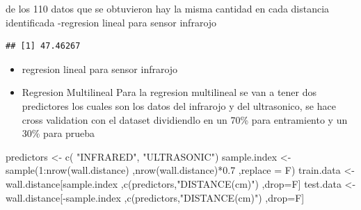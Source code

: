 \documentclass[
]{article}
\newenvironment{Shaded}{\begin{snugshade}}{\end{snugshade}}
\newcommand{\AttributeTok}[1]{\textcolor[rgb]{0.77,0.63,0.00}{#1}}
\newcommand{\DecValTok}[1]{\textcolor[rgb]{0.00,0.00,0.81}{#1}}
\newcommand{\FloatTok}[1]{\textcolor[rgb]{0.00,0.00,0.81}{#1}}
\newcommand{\FunctionTok}[1]{\textcolor[rgb]{0.00,0.00,0.00}{#1}}
\newcommand{\NormalTok}[1]{#1}
\newcommand{\OtherTok}[1]{\textcolor[rgb]{0.56,0.35,0.01}{#1}}
\newcommand{\SpecialCharTok}[1]{\textcolor[rgb]{0.00,0.00,0.00}{#1}}
\newcommand{\StringTok}[1]{\textcolor[rgb]{0.31,0.60,0.02}{#1}}
\begin{document}
de los 110 datos que se obtuvieron hay la misma cantidad en cada
distancia identificada -regresion lineal para sensor infrarojo

\begin{Shaded}
\end{Shaded}

\begin{verbatim}
## [1] 47.46267
\end{verbatim}

\begin{itemize}
\item
  regresion lineal para sensor infrarojo
\item
  Regresion Multilineal Para la regresion multilineal se van a tener dos
  predictores los cuales son los datos del infrarojo y del ultrasonico,
  se hace cross validation con el dataset dividiendlo en un 70\% para
  entramiento y un 30\% para prueba
\end{itemize}

\begin{Shaded}
\begin{Highlighting}[]
\NormalTok{predictors }\OtherTok{\textless{}{-}} \FunctionTok{c}\NormalTok{( }\StringTok{"INFRARED"}\NormalTok{, }\StringTok{"ULTRASONIC"}\NormalTok{)}
\NormalTok{sample.index }\OtherTok{\textless{}{-}} \FunctionTok{sample}\NormalTok{(}\DecValTok{1}\SpecialCharTok{:}\FunctionTok{nrow}\NormalTok{(wall.distance)}
\NormalTok{                       ,}\FunctionTok{nrow}\NormalTok{(wall.distance)}\SpecialCharTok{*}\FloatTok{0.7}
\NormalTok{                       ,}\AttributeTok{replace =}\NormalTok{ F)}
\NormalTok{train.data  }\OtherTok{\textless{}{-}}\NormalTok{  wall.distance[sample.index}
\NormalTok{                                   ,}\FunctionTok{c}\NormalTok{(predictors,}\StringTok{"DISTANCE(cm)"}\NormalTok{)}
\NormalTok{                                   ,drop}\OtherTok{=}\NormalTok{F]}
\NormalTok{test.data  }\OtherTok{\textless{}{-}}\NormalTok{  wall.distance[}\SpecialCharTok{{-}}\NormalTok{sample.index}
\NormalTok{                                  ,}\FunctionTok{c}\NormalTok{(predictors,}\StringTok{"DISTANCE(cm)"}\NormalTok{)}
\NormalTok{                                  ,drop}\OtherTok{=}\NormalTok{F]}
\end{Highlighting}
\end{Shaded}
\end{document}
